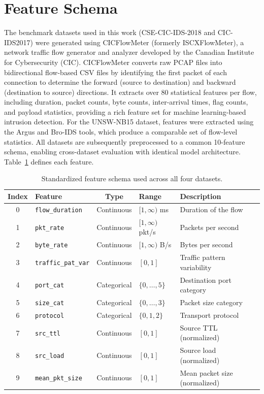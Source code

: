 \documentclass[12pt, letterpaper, oneside]{report}
\begin{document}
\section{Feature Schema}
\label{sec:feature_schema}

The benchmark datasets used in this work (CSE-CIC-IDS-2018 and CIC-IDS2017) were generated using CICFlowMeter (formerly ISCXFlowMeter), a network traffic flow generator and analyzer developed by the Canadian Institute for Cybersecurity (CIC). CICFlowMeter converts raw PCAP files into bidirectional flow-based CSV files by identifying the first packet of each connection to determine the forward (source to destination) and backward (destination to source) directions. It extracts over 80 statistical features per flow, including duration, packet counts, byte counts, inter-arrival times, flag counts, and payload statistics, providing a rich feature set for machine learning-based intrusion detection. For the UNSW-NB15 dataset, features were extracted using the Argus and Bro-IDS tools, which produce a comparable set of flow-level statistics. All datasets are subsequently preprocessed to a common 10-feature schema, enabling cross-dataset evaluation with identical model architecture. Table~\ref{tab:features} defines each feature.

\begin{table}[htbp]
\centering
\caption{Standardized feature schema used across all four datasets.}
\label{tab:features}
\small
\begin{tabular}{clcll}
\toprule
\textbf{Index} & \textbf{Feature} & \textbf{Type} & \textbf{Range} & \textbf{Description} \\
\midrule
0 & \texttt{flow\_duration} & Continuous & $[1, \infty)$ ms & Duration of the flow \\
1 & \texttt{pkt\_rate} & Continuous & $[1, \infty)$ pkt/s & Packets per second \\
2 & \texttt{byte\_rate} & Continuous & $[1, \infty)$ B/s & Bytes per second \\
3 & \texttt{traffic\_pat\_var} & Continuous & $[0, 1]$ & Traffic pattern variability \\
4 & \texttt{port\_cat} & Categorical & $\{0,\ldots,5\}$ & Destination port category \\
5 & \texttt{size\_cat} & Categorical & $\{0,\ldots,3\}$ & Packet size category \\
6 & \texttt{protocol} & Categorical & $\{0,1,2\}$ & Transport protocol \\
7 & \texttt{src\_ttl} & Continuous & $[0, 1]$ & Source TTL (normalized) \\
8 & \texttt{src\_load} & Continuous & $[0, 1]$ & Source load (normalized) \\
9 & \texttt{mean\_pkt\_size} & Continuous & $[0, 1]$ & Mean packet size (normalized) \\
\bottomrule
\end{tabular}
\end{table}
\end{document}
